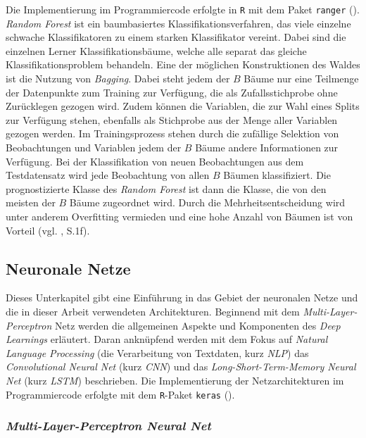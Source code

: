 \documentclass[a4paper,11pt]{article}
\begin{document}
Die Implementierung im Programmiercode erfolgte in \texttt{R} mit dem Paket \texttt{ranger} (\cite{ranger}).\\

\textit{Random Forest} ist ein baumbasiertes Klassifikationsverfahren, das viele einzelne schwache Klassifikatoren zu einem starken Klassifikator vereint. Dabei sind die einzelnen Lerner Klassifikationsbäume, welche alle separat das gleiche Klassifikationsproblem behandeln. Eine der möglichen Konstruktionen des Waldes ist die Nutzung von \textit{Bagging}. Dabei steht jedem der $B$ Bäume nur eine Teilmenge der Datenpunkte zum Training zur Verfügung, die als Zufallsstichprobe ohne Zurücklegen gezogen wird. Zudem können die Variablen, die zur Wahl eines Splits zur Verfügung stehen, ebenfalls als Stichprobe aus der Menge aller Variablen gezogen werden. Im Trainingsprozess stehen durch die zufällige Selektion von Beobachtungen und Variablen jedem der $B$ Bäume andere Informationen zur Verfügung. Bei der Klassifikation von neuen Beobachtungen aus dem Testdatensatz wird jede Beobachtung von allen $B$ Bäumen klassifiziert. Die prognostizierte Klasse des \textit{Random Forest} ist dann die Klasse, die von den meisten der $B$ Bäume zugeordnet wird. Durch die Mehrheitsentscheidung wird unter anderem Overfitting vermieden und eine hohe Anzahl von Bäumen ist von Vorteil (vgl. \cite{RF}, S.1f). 



\subsection{Neuronale Netze} \label{kap:neuralNets}

Dieses Unterkapitel gibt eine Einführung in das Gebiet der neuronalen Netze und die in dieser Arbeit verwendeten Architekturen. Beginnend mit dem \textit{Multi-Layer-Perceptron} Netz werden die allgemeinen Aspekte und Komponenten des \textit{Deep Learnings} erläutert. Daran anknüpfend werden mit dem Fokus auf \textit{Natural Language Processing} (die Verarbeitung von Textdaten, kurz \textit{NLP}) das \textit{Convolutional Neural Net} (kurz \textit{CNN}) und das \textit{Long-Short-Term-Memory Neural Net} (kurz \textit{LSTM}) beschrieben. Die Implementierung der Netzarchitekturen im Programmiercode erfolgte mit dem \texttt{R}-Paket \texttt{keras} (\cite{kerasR}).


\subsubsection{\textit{Multi-Layer-Perceptron Neural Net}}
\end{document}

